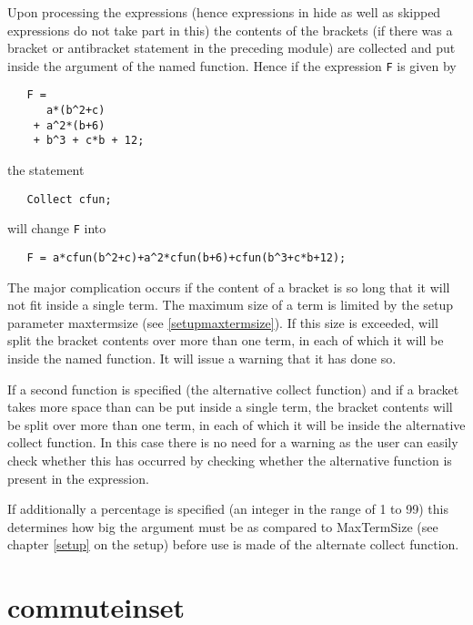 \noindent Upon processing the expressions (hence expressions 
in hide as well as skipped expressions do not take part in this) the 
contents of the brackets (if there was a bracket or 
antibracket statement in the preceding module) are 
collected and put inside the argument of the named function. Hence if the 
expression \verb:F: is given by
\begin{verbatim}
   F =
      a*(b^2+c)
    + a^2*(b+6)
    + b^3 + c*b + 12;
\end{verbatim}
the statement
\begin{verbatim}
   Collect cfun;
\end{verbatim}
will change \verb:F: into
\begin{verbatim}
   F = a*cfun(b^2+c)+a^2*cfun(b+6)+cfun(b^3+c*b+12);
\end{verbatim}
The major complication occurs if the content of a 
bracket is so long that it will not fit inside a single term. The maximum 
size of a term is limited by the setup parameter 
maxtermsize (see \ref{setupmaxtermsize}). If this size 
is exceeded, {\FORM} will split the bracket contents over more than one term, 
in each of which it will be inside the named function. It will issue a 
warning that it has done so. \vspace{4mm}

\noindent If a second function is specified (the 
alternative collect function) and if a bracket takes 
more space than can be put inside a single term, the bracket contents will 
be split over more than one term, in each of which it will be inside the 
alternative collect function. In this case there is no need for a 
warning 
as the user can easily check whether this has occurred by checking whether 
the alternative function is present in the expression. \vspace{4mm}

\noindent If additionally a percentage is specified (an 
integer in the range of 1 to 99) this determines how big the argument must 
be as compared to MaxTermSize (see chapter \ref{setup} on the setup) before 
use is made of the alternate collect function. \vspace{10mm}

 
\section{commuteinset}
\label{substacommuteinset}

